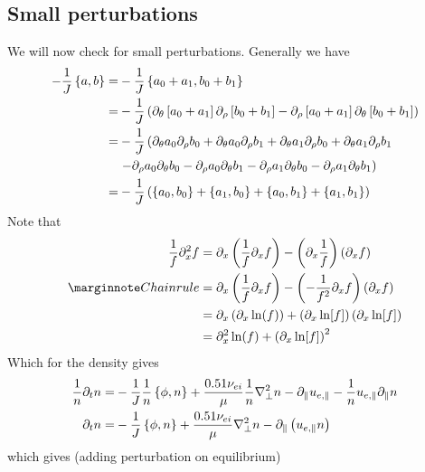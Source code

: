 \subsection{Small perturbations}
We will now check for small perturbations.
Generally we have
\begin{align*}
    -\frac{1}{J}\left\{a,b\right\}
 =&
 -\frac{1}{J}\left\{a_0+a_1,b_0+b_1\right\}
\\
 =&
 -\frac{1}{J} \left( \partial_\theta \left[ a_0 + a_1 \right]
                  \partial_\rho   \left[ b_0 + b_1 \right]
                - \partial_\rho   \left[ a_0 + a_1 \right]
                  \partial_\theta \left[ b_0 +b_1 \right]
                \right)
\\
 =&
 -\frac{1}{J} \left(
   \partial_\theta a_0 \partial_\rho b_0
 + \partial_\theta a_0 \partial_\rho b_1
 + \partial_\theta a_1 \partial_\rho b_0
 + \partial_\theta a_1 \partial_\rho b_1
 \right.
 \\&
 \left.
 - \partial_\rho a_0 \partial_\theta b_0
 - \partial_\rho a_0 \partial_\theta b_1
 - \partial_\rho a_1 \partial_\theta b_0
 - \partial_\rho a_1 \partial_\theta b_1
                \right)
\\
 =&
 -\frac{1}{J} \left(
   \left\{a_0,b_0\right\}
 + \left\{a_1,b_0\right\}
 + \left\{a_0,b_1\right\}
 + \left\{a_1,b_1\right\}
                \right)
\end{align*}
Note that
\begin{align*}
    \frac{1}{f}\partial_x^2 f
    &=
    \partial_x\L(\frac{1}{f}\partial_x f\R)
    - \L(\partial_x\frac{1}{f}\R)\L(\partial_x f\R)
    \\
    \note{Chain rule}
    &=
    \partial_x\L(\frac{1}{f}\partial_x f\R)
    - \L(-\frac{1}{f^2}\partial_x f\R)\L(\partial_x f\R)
    \\
    &=
    \partial_x\L(\partial_x \ln(f)\R)
    + \L(\partial_x \ln[f]\R)\L(\partial_x \ln[f]\R)
    \\
    &=
    \partial_x^2 \ln(f)
    + \L(\partial_x \ln[f]\R)^2
\end{align*}
Which for the density gives
\begin{align*}
 \frac{1}{n}\partial_t n
 =&
 -\frac{1}{J}\frac{1}{n}\L\{\phi,n\R\}
 +\frac{0.51\nu_{ei}}{\mu} \frac{1}{n}\grad_\perp^2 n
- \partial_\|u_{e,\|}
- \frac{1}{n}u_{e,\|} \partial_\| n
\\
%
 \partial_t n
 =&
 -\frac{1}{J}\L\{\phi,n\R\}
 +\frac{0.51\nu_{ei}}{\mu} \grad_\perp^2 n
-  \partial_\| \L(u_{e,\|}n\R)
\end{align*}
which gives (adding perturbation on equilibrium)
